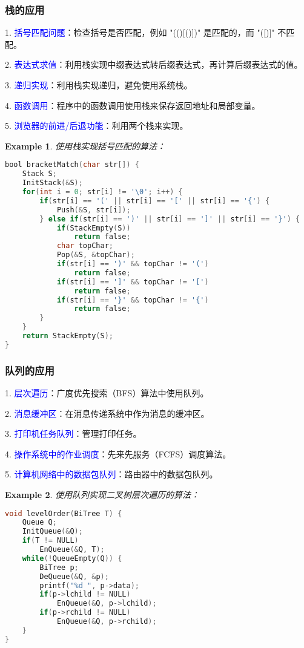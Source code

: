 \documentclass{../../note}
\newtheorem{example}{Example}
\begin{document}
\subsubsection{栈的应用}

1. \textcolor{blue}{括号匹配问题}：检查括号是否匹配，例如 "(()[()])" 是匹配的，而 "([)]" 不匹配。

2. \textcolor{blue}{表达式求值}：利用栈实现中缀表达式转后缀表达式，再计算后缀表达式的值。

3. \textcolor{blue}{递归实现}：利用栈实现递归，避免使用系统栈。

4. \textcolor{blue}{函数调用}：程序中的函数调用使用栈来保存返回地址和局部变量。

5. \textcolor{blue}{浏览器的前进/后退功能}：利用两个栈来实现。

\begin{example}
  使用栈实现括号匹配的算法：
\begin{lstlisting}[language=C]
bool bracketMatch(char str[]) {
    Stack S;
    InitStack(&S);
    for(int i = 0; str[i] != '\0'; i++) {
        if(str[i] == '(' || str[i] == '[' || str[i] == '{') {
            Push(&S, str[i]);
        } else if(str[i] == ')' || str[i] == ']' || str[i] == '}') {
            if(StackEmpty(S))
                return false;
            char topChar;
            Pop(&S, &topChar);
            if(str[i] == ')' && topChar != '(')
                return false;
            if(str[i] == ']' && topChar != '[')
                return false;
            if(str[i] == '}' && topChar != '{')
                return false;
        }
    }
    return StackEmpty(S);
}
\end{lstlisting}
\end{example}

\subsubsection{队列的应用}

1. \textcolor{blue}{层次遍历}：广度优先搜索（BFS）算法中使用队列。

2. \textcolor{blue}{消息缓冲区}：在消息传递系统中作为消息的缓冲区。

3. \textcolor{blue}{打印机任务队列}：管理打印任务。

4. \textcolor{blue}{操作系统中的作业调度}：先来先服务（FCFS）调度算法。

5. \textcolor{blue}{计算机网络中的数据包队列}：路由器中的数据包队列。

\begin{example}
  使用队列实现二叉树层次遍历的算法：
\begin{lstlisting}[language=C]
void levelOrder(BiTree T) {
    Queue Q;
    InitQueue(&Q);
    if(T != NULL)
        EnQueue(&Q, T);
    while(!QueueEmpty(Q)) {
        BiTree p;
        DeQueue(&Q, &p);
        printf("%d ", p->data);
        if(p->lchild != NULL)
            EnQueue(&Q, p->lchild);
        if(p->rchild != NULL)
            EnQueue(&Q, p->rchild);
    }
}
\end{lstlisting}
\end{example}
\end{document}

